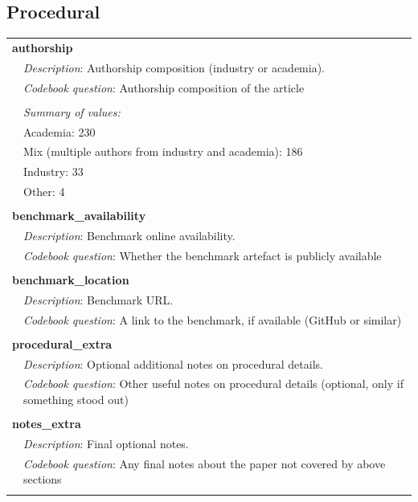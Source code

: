 \subsection{Procedural}
{\small\begin{longtable}{p{}p{}}
\multicolumn{2}{l}{\textbf{authorship}} \\
& \textit{Description}: Authorship composition (industry or academia). \\
& \textit{Codebook question}: Authorship composition of the article \\
\\
& \textit{Summary of values:} \\
& Academia: 230 \\
& Mix (multiple authors from industry and academia): 186 \\
& Industry: 33 \\
& Other: 4 \\
\\
\multicolumn{2}{l}{\textbf{benchmark\_availability}} \\
& \textit{Description}: Benchmark online availability. \\
& \textit{Codebook question}: Whether the benchmark artefact is publicly available \\
\\
\multicolumn{2}{l}{\textbf{benchmark\_location}} \\
& \textit{Description}: Benchmark URL. \\
& \textit{Codebook question}: A link to the benchmark, if available (GitHub or similar) \\
\\
\multicolumn{2}{l}{\textbf{procedural\_extra}} \\
& \textit{Description}: Optional additional notes on procedural details. \\
& \textit{Codebook question}: Other useful notes on procedural details  (optional, only if something stood out) \\
\\
\multicolumn{2}{l}{\textbf{notes\_extra}} \\
& \textit{Description}: Final optional notes. \\
& \textit{Codebook question}: Any final notes about the paper not covered by above sections \\
\\
\end{longtable}}
